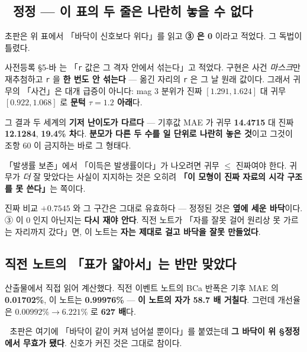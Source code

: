 \documentclass{article}
\begin{document}
\subsection{🔴 정정 --- 이 표의 두 줄은 나란히 놓을 수 없다}

초판은 위 표에서 「바닥이 신호보다 위다」를 읽고 \textbf{③ 은 0} 이라고 적었다. 그 독법이 틀렸다.

{사전등록 §5-바 는 「\texttt{r} 값은 그 격자 안에서 섞는다」고 적었다.
구현은 사건 \emph{마스크}만 재추첨하고 \texttt{r} 을 \textbf{한 번도 안 섞는다}
--- 옮긴 자리의 \texttt{r} 은 그 날 원래 값이다.
그래서 귀무의 「사건」은 대개 급증이 아니다: mag 3 분위가
진짜 $[1.291, 1.624]$ 대 귀무 $[0.922, 1.068]$ 로 \textbf{문턱 $\tau=1.2$ 아래}다.}

그 결과 두 세계의 \textbf{기저 난이도가 다르다} --- 기후값 MAE 가
귀무 \textbf{14.4715} 대 진짜 \textbf{12.1284}, \textbf{19.4\% 차}다.
\textbf{분모가 다른 두 수를 일 단위로 나란히 놓은 것}이고 그것이 조항 60 이 금지하는 바로 그 형태다.

{「발생률 보존」에서 「이득은 발생률이다」가 나오려면 귀무 $\le$ 진짜여야 한다.
귀무가 \emph{더} 잘 맞았다는 사실이 지지하는 것은 오히려
\textbf{「이 모형이 진짜 자료의 시각 구조를 못 쓴다」}는 쪽이다.}

{진짜 비교 $+0.7545$ 와 그 구간은 그대로 유효하다 --- 정정된 것은 \textbf{옆에 세운 바닥}이다.
③ 이 0 인지 아닌지는 \textbf{다시 재야 안다}.}
직전 노트가 「자를 잘못 걸어 원리상 못 가르는 자리까지 갔다」면,
이 노트는 \textbf{자는 제대로 걸고 바닥을 잘못 만들었다}.

\subsection{직전 노트의 「표가 얇아서」는 반만 맞았다}

산출물에서 직접 읽어 계산했다. 직전 이벤트 노트의 BCa 반폭은 기후 MAE 의 \textbf{0.01702\%},
이 노트는 \textbf{0.99976\%} --- \textbf{이 노트의 자가 58.7 배 거칠다}.
그런데 개선율은 $0.00992\% \to 6.221\%$ 로 \textbf{627 배}다.

{🔴 초판은 여기에 「바닥이 같이 커져 넘어설 뿐이다」를 붙였는데
\textbf{그 바닥이 위 §정정에서 무효가 됐다}. 신호가 커진 것은 그대로 참이다.}
\end{document}
